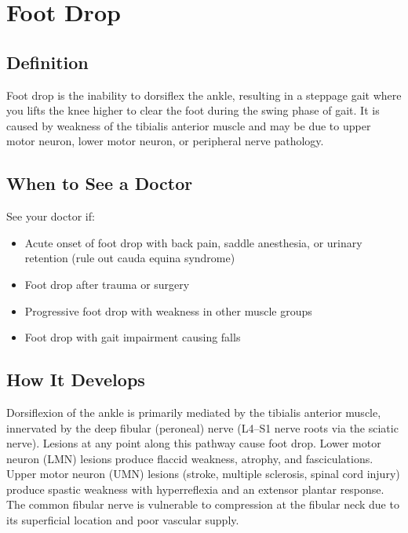 \chapter{Foot Drop}

\section*{Definition}
Foot drop is the inability to dorsiflex the ankle, resulting in a steppage gait where you lifts the knee higher to clear the foot during the swing phase of gait. It is caused by weakness of the tibialis anterior muscle and may be due to upper motor neuron, lower motor neuron, or peripheral nerve pathology.

\section*{When to See a Doctor}
See your doctor if:
\begin{itemize}
  \item Acute onset of foot drop with back pain, saddle anesthesia, or urinary retention (rule out cauda equina syndrome)
  \item Foot drop after trauma or surgery
  \item Progressive foot drop with weakness in other muscle groups
  \item Foot drop with gait impairment causing falls
\end{itemize}

\section*{How It Develops}
Dorsiflexion of the ankle is primarily mediated by the tibialis anterior muscle, innervated by the deep fibular (peroneal) nerve (L4--S1 nerve roots via the sciatic nerve). Lesions at any point along this pathway cause foot drop. Lower motor neuron (LMN) lesions produce flaccid weakness, atrophy, and fasciculations. Upper motor neuron (UMN) lesions (stroke, multiple sclerosis, spinal cord injury) produce spastic weakness with hyperreflexia and an extensor plantar response. The common fibular nerve is vulnerable to compression at the fibular neck due to its superficial location and poor vascular supply.

